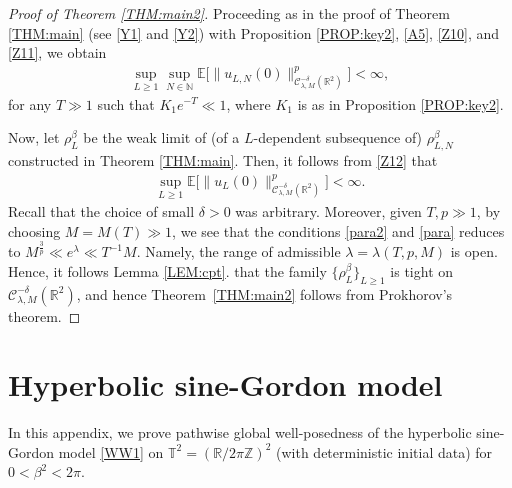 \documentclass[letterpaper, 11pt,  reqno]{amsart}
\newcommand{\Rd}{\color{red}}
\theoremstyle{myremark}
\newtheorem{remark}[theorem]{Remark}
\newcommand{\1}{\hspace{0.5mm}\text{I}\hspace{0.5mm}}
\newcommand{\Z}{\mathbb{Z}}
\newcommand{\R}{\mathbb{R}}
\newcommand{\T}{\mathbb{T}}
\newcommand{\CC}{\mathcal{C}}
\newcommand{\E}{\mathbb{E}}
\newcommand{\be}{\beta}
\newcommand{\dl}{\delta}
\newcommand{\ld}{\lambda}
\newcommand{\N}{\mathbb{N}}
\numberwithin{equation}{section}
\numberwithin{theorem}{section}
\begin{document}
\begin{proof}[Proof of Theorem \ref{THM:main2}]
Proceeding as in the proof of Theorem \ref{THM:main} 
(see \eqref{Y1} and \eqref{Y2}) 
with Proposition \ref{PROP:key2}, 
\eqref{A5}, \eqref{Z10}, and \eqref{Z11}, 
we obtain
\begin{align}
\sup_{L\ge 1} \sup_{N \in \N} \E \big[ \| u_{L, N}(0) \|_{\CC^{-\dl}_{\ld, M}(\R^2)}^{p} \big]  < \infty,
\label{Z12}
\end{align}
for any  $T\gg 1$ such that $K_1 e^{-T} \ll1 $,
where $K_1$ is as in 
Proposition \ref{PROP:key2}.


Now, let $\rho_L^\be$ be the weak limit of 
(of a $L$-dependent subsequence of) $\rho_{L, N}^\be$
constructed in Theorem \ref{THM:main}.
Then, 
it follows from \eqref{Z12} that 
\begin{align*}
\sup_{L\ge 1}  \E \big[ \| u_{L}(0) \|_{\CC^{-\dl}_{\ld, M}(\R^2)}^{p} \big]  < \infty.
\end{align*}
Recall that the choice of small $\delta>0$ was arbitrary.
Moreover, given $T,  p \gg1$, 
by choosing $M = M(T) \gg 1$, 
we see that 
 the conditions \eqref{para2} and \eqref{para}
reduces to
$M^{\frac 3p} \ll e^\ld \ll T^{-1} M$.
Namely, the range of admissible 
$\ld = \ld (T, p, M)$ is open.
Hence, it follows 
Lemma \ref{LEM:cpt}.
that the family $\{\rho_{L}^\be\}_{L\ge 1}$
is tight on $\CC^{-\dl}_{\ld, M}(\R^2)$, 
and hence  Theorem~\ref{THM:main2} follows from Prokhorov's theorem.
\end{proof}

%







\appendix

\section{Hyperbolic sine-Gordon model}
\label{SEC:wave}



In this appendix, 
we prove pathwise global well-posedness of 
the 
hyperbolic sine-Gordon model \eqref{WW1} on 
$\T^2 = (\R/2\pi \Z)^2$
(with deterministic initial data) 
for $0 < \be^2 < 2\pi$.
\end{document}
